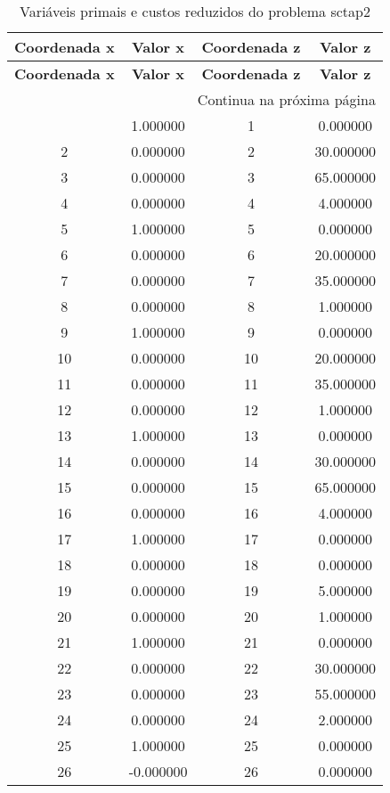 \documentclass[12pt]{article}
\begin{document}
\begin{longtable}{@{}cccc@{}}
\caption{Variáveis primais e custos reduzidos do problema sctap2} \\
\toprule
\textbf{Coordenada x} & \textbf{Valor x} & \textbf{Coordenada z} & \textbf{Valor z} \\
\midrule
\endfirsthead

\toprule
\textbf{Coordenada x} & \textbf{Valor x} & \textbf{Coordenada z} & \textbf{Valor z} \\
\midrule
\endhead

\midrule \multicolumn{4}{r}{{Continua na próxima página}} \\ \midrule
\endfoot

\bottomrule
\endlastfoot
1 & 1.000000 & 1 & 0.000000 \\
2 & 0.000000 & 2 & 30.000000 \\
3 & 0.000000 & 3 & 65.000000 \\
4 & 0.000000 & 4 & 4.000000 \\
5 & 1.000000 & 5 & 0.000000 \\
6 & 0.000000 & 6 & 20.000000 \\
7 & 0.000000 & 7 & 35.000000 \\
8 & 0.000000 & 8 & 1.000000 \\
9 & 1.000000 & 9 & 0.000000 \\
10 & 0.000000 & 10 & 20.000000 \\
11 & 0.000000 & 11 & 35.000000 \\
12 & 0.000000 & 12 & 1.000000 \\
13 & 1.000000 & 13 & 0.000000 \\
14 & 0.000000 & 14 & 30.000000 \\
15 & 0.000000 & 15 & 65.000000 \\
16 & 0.000000 & 16 & 4.000000 \\
17 & 1.000000 & 17 & 0.000000 \\
18 & 0.000000 & 18 & 0.000000 \\
19 & 0.000000 & 19 & 5.000000 \\
20 & 0.000000 & 20 & 1.000000 \\
21 & 1.000000 & 21 & 0.000000 \\
22 & 0.000000 & 22 & 30.000000 \\
23 & 0.000000 & 23 & 55.000000 \\
24 & 0.000000 & 24 & 2.000000 \\
25 & 1.000000 & 25 & 0.000000 \\
26 & -0.000000 & 26 & 0.000000 \\

\end{longtable}
\end{document}
